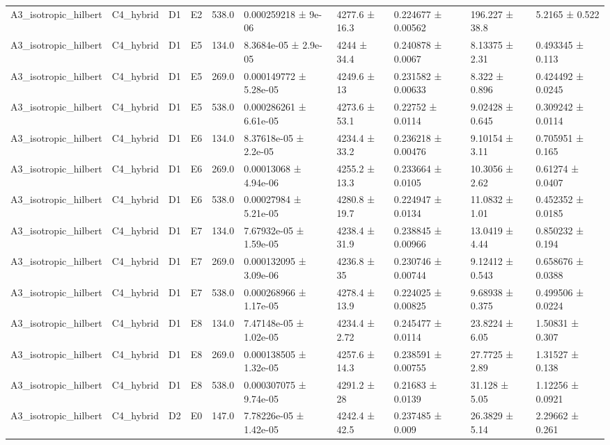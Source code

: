 \begin{table}
\begin{tabular}{llllllllll}
A3\_isotropic\_hilbert & C4\_hybrid & D1 & E2 & 538.0 & 0.000259218 ± 9e-06 & 4277.6 ± 16.3 & 0.224677 ± 0.00562 & 196.227 ± 38.8 & 5.2165 ± 0.522 \\
A3\_isotropic\_hilbert & C4\_hybrid & D1 & E5 & 134.0 & 8.3684e-05 ± 2.9e-05 & 4244 ± 34.4 & 0.240878 ± 0.0067 & 8.13375 ± 2.31 & 0.493345 ± 0.113 \\
A3\_isotropic\_hilbert & C4\_hybrid & D1 & E5 & 269.0 & 0.000149772 ± 5.28e-05 & 4249.6 ± 13 & 0.231582 ± 0.00633 & 8.322 ± 0.896 & 0.424492 ± 0.0245 \\
A3\_isotropic\_hilbert & C4\_hybrid & D1 & E5 & 538.0 & 0.000286261 ± 6.61e-05 & 4273.6 ± 53.1 & 0.22752 ± 0.0114 & 9.02428 ± 0.645 & 0.309242 ± 0.0114 \\
A3\_isotropic\_hilbert & C4\_hybrid & D1 & E6 & 134.0 & 8.37618e-05 ± 2.2e-05 & 4234.4 ± 33.2 & 0.236218 ± 0.00476 & 9.10154 ± 3.11 & 0.705951 ± 0.165 \\
A3\_isotropic\_hilbert & C4\_hybrid & D1 & E6 & 269.0 & 0.00013068 ± 4.94e-06 & 4255.2 ± 13.3 & 0.233664 ± 0.0105 & 10.3056 ± 2.62 & 0.61274 ± 0.0407 \\
A3\_isotropic\_hilbert & C4\_hybrid & D1 & E6 & 538.0 & 0.00027984 ± 5.21e-05 & 4280.8 ± 19.7 & 0.224947 ± 0.0134 & 11.0832 ± 1.01 & 0.452352 ± 0.0185 \\
A3\_isotropic\_hilbert & C4\_hybrid & D1 & E7 & 134.0 & 7.67932e-05 ± 1.59e-05 & 4238.4 ± 31.9 & 0.238845 ± 0.00966 & 13.0419 ± 4.44 & 0.850232 ± 0.194 \\
A3\_isotropic\_hilbert & C4\_hybrid & D1 & E7 & 269.0 & 0.000132095 ± 3.09e-06 & 4236.8 ± 35 & 0.230746 ± 0.00744 & 9.12412 ± 0.543 & 0.658676 ± 0.0388 \\
A3\_isotropic\_hilbert & C4\_hybrid & D1 & E7 & 538.0 & 0.000268966 ± 1.17e-05 & 4278.4 ± 13.9 & 0.224025 ± 0.00825 & 9.68938 ± 0.375 & 0.499506 ± 0.0224 \\
A3\_isotropic\_hilbert & C4\_hybrid & D1 & E8 & 134.0 & 7.47148e-05 ± 1.02e-05 & 4234.4 ± 2.72 & 0.245477 ± 0.0114 & 23.8224 ± 6.05 & 1.50831 ± 0.307 \\
A3\_isotropic\_hilbert & C4\_hybrid & D1 & E8 & 269.0 & 0.000138505 ± 1.32e-05 & 4257.6 ± 14.3 & 0.238591 ± 0.00755 & 27.7725 ± 2.89 & 1.31527 ± 0.138 \\
A3\_isotropic\_hilbert & C4\_hybrid & D1 & E8 & 538.0 & 0.000307075 ± 9.74e-05 & 4291.2 ± 28 & 0.21683 ± 0.0139 & 31.128 ± 5.05 & 1.12256 ± 0.0921 \\
A3\_isotropic\_hilbert & C4\_hybrid & D2 & E0 & 147.0 & 7.78226e-05 ± 1.42e-05 & 4242.4 ± 42.5 & 0.237485 ± 0.009 & 26.3829 ± 5.14 & 2.29662 ± 0.261 \\

\end{tabular}
\end{table}
